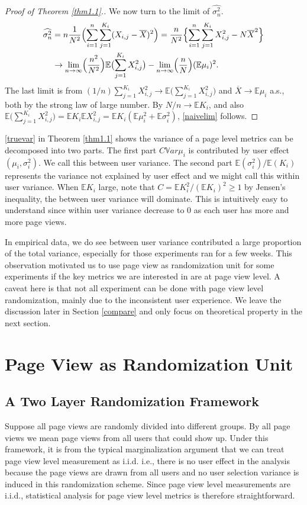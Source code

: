 \documentclass[11pt]{asaproc}
\newcommand{\wht}{\widehat}
\newcommand{\var}{\ensuremath{\mathbb Var}}
\newcommand{\bbe}{\mathbb{E}}
\newcommand{\xbar}{\overline{X}}
\newcommand{\Xij}{X_{i,j}}
\newcommand{\naiveest}{\wht{\sigma^2_n}}
\begin{document}
\begin{proof}[Proof of Theorem \ref{thm1.1}.]
We now turn to the limit of $\naiveest$. 
\begin{align*}
 \naiveest &= n \frac{1}{N^2} \Bigl (\sum_{i=1}^n \sum_{j=1}^{K_i} (X_{i,j}-\overline{X})^2 \Bigr )= \frac{n}{N^2} \Bigl \{  \sum_{i=1}^n \sum_{j=1}^{K_i} X_{i,j}^2 - N \xbar^2 \Bigr\}\\
&\to   \lim_{n\to \infty} \Bigl(\frac{n^2}{N^2}\Bigr) \bbe \bigl(\sum_{j=1}^{K_i} \Xij^2 \bigr) -   \lim_{n\to \infty} \Bigl(\frac{n}{N}\Bigr) (\bbe \mu_i)^2 .
\end{align*}
The last limit is from $(1/n) \sum_{j=1}^{K_i} X_{i,j}^2 \to \bbe \bigl(\sum_{j=1}^{K_i} \Xij^2 \bigr)$ and $\xbar \to \bbe \mu_i$ a.s., both by the strong law of large number.
By $N/n \to \bbe K_i$, and also $\bbe \bigl(\sum_{j=1}^{K_i} \Xij^2 \bigr)  = \bbe K_i \bbe X_{i,j}^2 = \bbe K_i (\bbe \mu_i^2 + \bbe \sigma_i^2)$,
\eqref{naivelim} follows.
\end{proof}


\eqref{truevar} in Theorem \ref{thm1.1} shows the variance of a page level metrics can be decomposed into two parts. The first part $C\var\mu_i$ is contributed by user effect $(\mu_i,\sigma_i^2)$. We call this between user variance. The second part $\bbe(\sigma_i^2)/\bbe(K_i)$ represents the variance not explained by user effect and we might call this within user variance. When $\bbe K_i$ large, note that $C = \bbe K_i^2 / (\bbe K_i)^2 \ge 1$ by Jensen's inequality, the between user variance will dominate. This is intuitively easy to understand since within user variance decrease to $0$ as each user has more and more page views. 

In empirical data, we do see between user variance contributed a large proportion of the total variance, especially for those experiments ran for a few weeks. 
This observation motivated us to use page view as randomization unit for some experiments if the key metrics we are interested in are at page view level. A caveat here is that not all experiment can be done with page view level randomization, mainly due to the inconsistent user experience. We leave the discussion later in Section \ref{compare} and only focus on theoretical property in the next section. 

\section{Page View as Randomization Unit}\label{page}


\subsection{A Two Layer Randomization Framework}
Suppose all page views are randomly divided into different groups. By all page views we mean page views from all users that could show up. Under this framework, it is from the typical marginalization argument that we can treat page view level measurement as i.i.d. i.e., there is no user effect in the analysis because the page views are drawn from all users and no user selection variance is induced in this randomization scheme. Since page view level measurements are i.i.d.,  statistical analysis for page view level metrics is therefore straightforward. 
\end{document}
